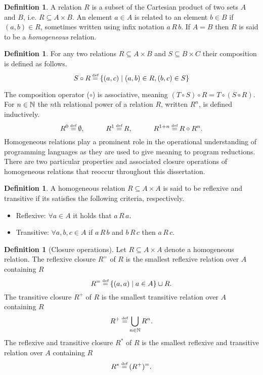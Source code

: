\documentclass[12pt,phd,lfcs,twoside,openright,logo,leftchapter,normalheadings]{infthesis}
\theoremstyle{plain}
\theoremstyle{definition}
\newtheorem{definition}[theorem]{Definition}
\begin{document}
\begin{definition}
  A relation $R$ is a subset of the Cartesian product of two sets $A$
  and $B$, i.e. $R \subseteq A \times B$.
  An element $a \in A$ is related to an element $b \in B$ if
  $(a, b) \in R$, sometimes written using infix notation $a\,R\,b$.
  If $A = B$ then $R$ is said to be a \emph{homogeneous} relation.
\end{definition}
%

\begin{definition}
  For any two relations $R \subseteq A \times B$ and
  $S \subseteq B \times C$ their composition is defined as follows.
  \[
    S \circ R \defas \{ (a,c) \mid (a,b) \in R, (b, c) \in S \}
  \]
\end{definition}

The composition operator ($\circ$) is associative, meaning
$(T \circ S) \circ R = T \circ (S \circ R)$.
%
For $n \in \mathbb{N}$ the $n$th relational power of a relation $R$, written
$R^n$, is defined inductively.
\[
  R^0 \defas \emptyset, \quad\qquad R^1 \defas R, \quad\qquad R^{1 + n} \defas R \circ R^n.
\]
%
Homogeneous relations play a prominent role in the operational
understanding of programming languages as they are used to give
meaning to program reductions. There are two particular properties and
associated closure operations of homogeneous relations that reoccur
throughout this dissertation.
%
\begin{definition}
  A homogeneous relation $R \subseteq A \times A$ is said to be
  reflexive and transitive if its satisfies the following criteria,
  respectively.
  \begin{itemize}
    \item Reflexive: $\forall a \in A$ it holds that $a\,R\,a$.
    \item Transitive: $\forall a,b,c \in A$ if $a\,R\,b$ and $b\,R\,c$
      then $a\,R\,c$.
  \end{itemize}
\end{definition}

\begin{definition}[Closure operations]
  Let $R \subseteq A \times A$ denote a homogeneous relation. The
  reflexive closure $R^{=}$ of $R$ is the smallest reflexive relation
  over $A$ containing $R$
  \[
    R^{=} \defas \{ (a, a) \mid a \in A \} \cup R.
  \]
  The transitive closure $R^+$ of $R$ is the smallest transitive
  relation over $A$ containing $R$
  \[
    R^+ \defas \displaystyle\bigcup_{n \in \N} R^n.
  \]
  The reflexive and transitive closure $R^\ast$ of $R$ is the smallest
  reflexive and transitive relation over $A$ containing $R$
  \[
    R^\ast \defas (R^+)^{=}.
  \]
\end{definition}
%
\end{document}
